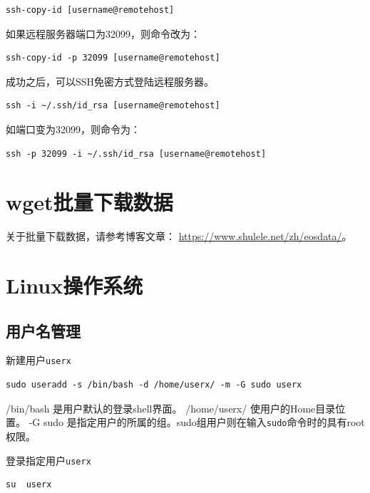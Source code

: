 \documentclass[
]{ctexbook}
\begin{document}
\begin{verbatim}
ssh-copy-id [username@remotehost]
\end{verbatim}

如果远程服务器端口为32099，则命令改为：

\begin{verbatim}
ssh-copy-id -p 32099 [username@remotehost]
\end{verbatim}

成功之后，可以SSH免密方式登陆远程服务器。

\begin{verbatim}
ssh -i ~/.ssh/id_rsa [username@remotehost]
\end{verbatim}

如端口变为32099，则命令为：

\begin{verbatim}
ssh -p 32099 -i ~/.ssh/id_rsa [username@remotehost]
\end{verbatim}

\hypertarget{wgetux6279ux91cfux4e0bux8f7dux6570ux636e}{%
\section{wget批量下载数据}\label{wgetux6279ux91cfux4e0bux8f7dux6570ux636e}}

关于批量下载数据，请参考博客文章： \url{https://www.shulele.net/zh/eosdata/}。

\hypertarget{linux}{%
\section{Linux操作系统}\label{linux}}

\hypertarget{linux-user}{%
\subsection{用户名管理}\label{linux-user}}

新建用户\texttt{userx}

\begin{verbatim}
sudo useradd -s /bin/bash -d /home/userx/ -m -G sudo userx
\end{verbatim}

/bin/bash 是用户默认的登录shell界面。
/home/userx/ 使用户的Home目录位置。
-G sudo 是指定用户的所属的组。sudo组用户则在输入\texttt{sudo}命令时的具有root权限。

登录指定用户\texttt{userx}

\begin{verbatim}
su  userx
\end{verbatim}
\end{document}

